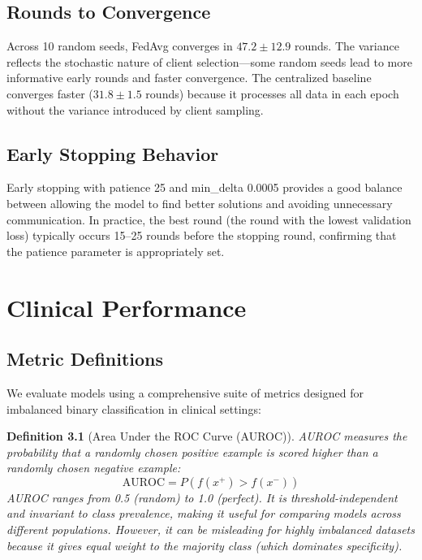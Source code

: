 \documentclass[11pt,a4paper]{report}
\newtheorem{definition}{Definition}[chapter]
\begin{document}
\section{Rounds to Convergence}

Across 10 random seeds, FedAvg converges in $47.2 \pm 12.9$ rounds. The variance reflects the stochastic nature of client selection---some random seeds lead to more informative early rounds and faster convergence. The centralized baseline converges faster ($31.8 \pm 1.5$ rounds) because it processes all data in each epoch without the variance introduced by client sampling.

\section{Early Stopping Behavior}

Early stopping with patience 25 and min\_delta 0.0005 provides a good balance between allowing the model to find better solutions and avoiding unnecessary communication. In practice, the best round (the round with the lowest validation loss) typically occurs 15--25 rounds before the stopping round, confirming that the patience parameter is appropriately set.


\chapter{Clinical Performance}
\label{ch:clinical}

\section{Metric Definitions}

We evaluate models using a comprehensive suite of metrics designed for imbalanced binary classification in clinical settings:

\begin{definition}[Area Under the ROC Curve (AUROC)]
AUROC measures the probability that a randomly chosen positive example is scored higher than a randomly chosen negative example:
\begin{equation}
\text{AUROC} = P(f(x^+) > f(x^-))
\end{equation}
AUROC ranges from 0.5 (random) to 1.0 (perfect). It is threshold-independent and invariant to class prevalence, making it useful for comparing models across different populations. However, it can be misleading for highly imbalanced datasets because it gives equal weight to the majority class (which dominates specificity).
\end{definition}
\end{document}

